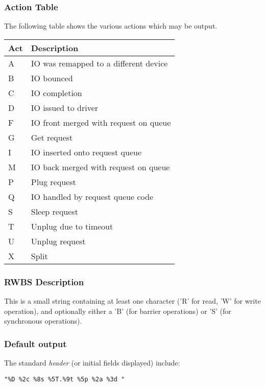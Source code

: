 \documentclass{article}
\begin{document}
\newpage
\subsubsection{\label{sec:act-table}Action Table}
The following table shows the various actions which may be output.

\begin{tabular}{|l|l|}\hline
Act & Description \\ \hline\hline
A & IO was remapped to a different device \\ \hline
B & IO bounced \\ \hline
C & IO completion \\ \hline
D & IO issued to driver \\ \hline
F & IO front merged with request on queue \\ \hline
G & Get request \\ \hline
I & IO inserted onto request queue \\ \hline
M & IO back merged with request on queue \\ \hline
P & Plug request \\ \hline
Q & IO handled by request queue code \\ \hline
S & Sleep request \\ \hline
T & Unplug due to timeout \\ \hline
U & Unplug request \\ \hline
X & Split \\ \hline
\end{tabular}

\subsubsection{\label{sec:act-table}RWBS Description}
This is a small string containing at least one character ('R' for read,
'W' for write operation), and optionally either a 'B' (for barrier
operations) or 'S' (for synchronous operations).

\subsubsection{\label{sec:default-output}Default output}

The standard \emph{header} (or initial fields displayed) include:

\begin{verbatim}
"%D %2c %8s %5T.%9t %5p %2a %3d "
\end{verbatim}
\end{document}
